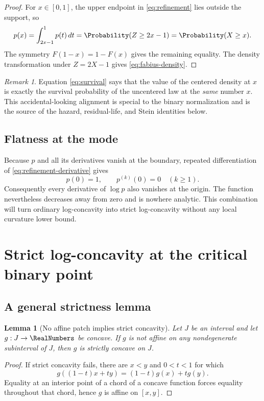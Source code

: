 \documentclass[11pt,oneside]{article}
\newtheorem{lemma}[theorem]{Lemma}
\theoremstyle{definition}
\theoremstyle{remark}
\newtheorem{remark}[theorem]{Remark}
\begin{document}
\begin{proof}
For $x\in[0,1]$, the upper endpoint in \eqref{eq:refinement} lies outside the
support, so
\[
 p(x)=\int_{2x-1}^{1}p(t)\,dt=\Probability(Z\ge2x-1)=\Probability(X\ge x).
\]
The symmetry $F(1-x)=1-F(x)$ gives the remaining equality.  The density
transformation under $Z=2X-1$ gives \eqref{eq:fabius-density}.
\end{proof}

\begin{remark}
Equation \eqref{eq:survival} says that the value of the centered density at $x$
is exactly the survival probability of the uncentered law at the \emph{same}
number $x$.  This accidental-looking alignment is special to the binary
normalization and is the source of the hazard, residual-life, and Stein identities
below.
\end{remark}

\subsection{Flatness at the mode}
Because $p$ and all its derivatives vanish at the boundary, repeated
differentiation of \eqref{eq:refinement-derivative} gives
\begin{equation}\label{eq:flat-mode}
 p(0)=1,
 \qquad p^{(k)}(0)=0\quad(k\ge1).
\end{equation}
Consequently every derivative of $\log p$ also vanishes at the origin.  The
function nevertheless decreases away from zero and is nowhere analytic.  This
combination will turn ordinary log-concavity into strict log-concavity without any
local curvature lower bound.

\section{Strict log-concavity at the critical binary point}

\subsection{A general strictness lemma}
\begin{lemma}[No affine patch implies strict concavity]\label{lem:no-affine}
Let $J$ be an interval and let $g:J\to\RealNumbers$ be concave.  If $g$ is not affine on
any nondegenerate subinterval of $J$, then $g$ is strictly concave on $J$.
\end{lemma}

\begin{proof}
If strict concavity fails, there are $x<y$ and $0<t<1$ for which
\[
 g((1-t)x+ty)=(1-t)g(x)+tg(y).
\]
Equality at an interior point of a chord of a concave function forces equality
throughout that chord, hence $g$ is affine on $[x,y]$.
\end{proof}
\end{document}

